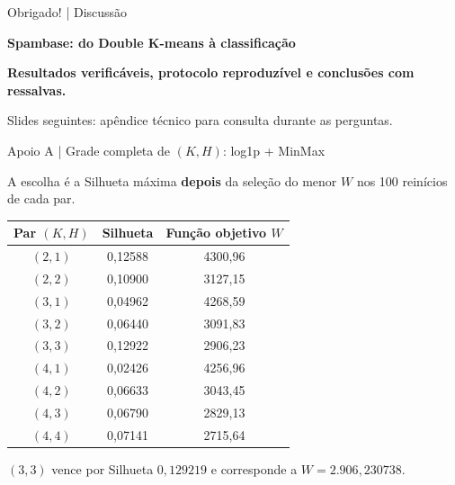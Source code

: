 \documentclass[aspectratio=169,11pt]{beamer}
\begin{document}
\begin{frame}[t]{Obrigado! | Discussão}

\vspace{1.1cm}\begin{center}
{\fontsize{24}{28}\selectfont\bfseries\color{cinazul}Spambase: do Double K-means à classificação}
\vspace{6mm}\par
\small\textbf{Resultados verificáveis, protocolo reproduzível e conclusões com ressalvas.}
\vspace{7mm}\par
\scriptsize Slides seguintes: apêndice técnico para consulta durante as perguntas.
\end{center}

\end{frame}

\appendix

\begin{frame}[t]{Apoio A | Grade completa de $(K,H)$: log1p + MinMax}

\small A escolha é a Silhueta máxima \textbf{depois} da seleção do menor $W$ nos 100 reinícios de cada par.\vspace{2mm}
\par
\scriptsize
\renewcommand{\arraystretch}{1.03}
\setlength{\tabcolsep}{4pt}
\centering
\begin{tabular}{ccc}
\toprule
Par $(K,H)$ & Silhueta & Função objetivo $W$ \\
\midrule
$(2,1)$ & 0,12588 & 4300,96 \\
$(2,2)$ & 0,10900 & 3127,15 \\
$(3,1)$ & 0,04962 & 4268,59 \\
$(3,2)$ & 0,06440 & 3091,83 \\
$(3,3)$ & 0,12922 & 2906,23 \\
$(4,1)$ & 0,02426 & 4256,96 \\
$(4,2)$ & 0,06633 & 3043,45 \\
$(4,3)$ & 0,06790 & 2829,13 \\
$(4,4)$ & 0,07141 & 2715,64 \\
\bottomrule
\end{tabular}
\par
\vspace{2mm}\begin{notabox}\scriptsize $(3,3)$ vence por Silhueta $0,129219$ e corresponde a $W=2.906,230738$.\end{notabox}

\end{frame}
\end{document}
